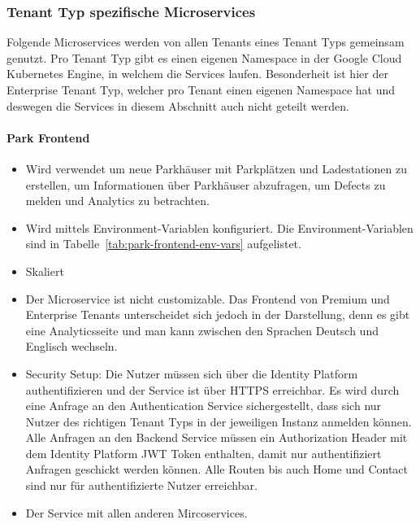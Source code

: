 \subsubsection{Tenant Typ spezifische Microservices}
Folgende Microservices werden von allen Tenants eines Tenant Typs gemeinsam genutzt. Pro Tenant Typ gibt es einen eigenen Namespace in der Google Cloud Kubernetes Engine, in welchem die Services laufen. Besonderheit ist hier der Enterprise Tenant Typ, welcher pro Tenant einen eigenen Namespace hat und deswegen die Services in diesem Abschnitt auch nicht geteilt werden.

\paragraph{Park Frontend}
\begin{itemize}
	\item Wird verwendet um neue Parkhäuser mit Parkplätzen und Ladestationen zu erstellen, um Informationen über Parkhäuser abzufragen, um Defects zu melden und Analytics zu betrachten.
	\item Wird mittels Environment-Variablen konfiguriert. Die Environment-Variablen sind in Tabelle~\ref{tab:park-frontend-env-vars} aufgelistet.
	\item Skaliert %
	\item Der Microservice ist nicht customizable. Das Frontend von Premium und Enterprise Tenants unterscheidet sich jedoch in der Darstellung, denn es gibt eine Analyticsseite und man kann zwischen den Sprachen Deutsch und Englisch wechseln.
	\item Security Setup: Die Nutzer müssen sich über die Identity Platform authentifizieren und der Service ist über HTTPS erreichbar. Es wird durch eine Anfrage an den Authentication Service sichergestellt, dass sich nur Nutzer des richtigen Tenant Typs in der jeweiligen Instanz anmelden können. Alle Anfragen an den Backend Service müssen ein Authorization Header mit dem Identity Platform JWT Token enthalten, damit nur authentifiziert Anfragen geschickt werden können. Alle Routen bis auch Home und Contact sind nur für authentifizierte Nutzer erreichbar.
	\item Der Service mit allen anderen Mircoservices.
\end{itemize}

